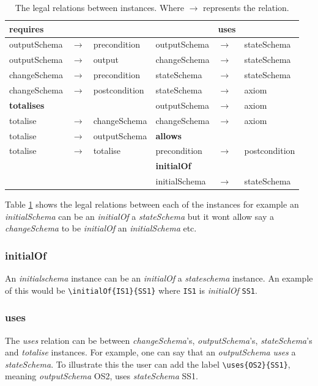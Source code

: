 \begin{table}[H]
\begin{tabular}{|lll||lll|}
\hline
\textbf{requires} & & &  & \textbf{uses} & \\
\hline
outputSchema & $\longrightarrow$ & precondition  & outputSchema & $\longrightarrow$ & stateSchema\\
outputSchema & $\longrightarrow$ & output & changeSchema & $\longrightarrow$ & stateSchema \\
changeSchema & $\longrightarrow$ & precondition  & stateSchema & $\longrightarrow$ & stateSchema \\
changeSchema & $\longrightarrow$ & postcondition  & stateSchema & $\longrightarrow$ & axiom \\
\cline{1-3}
\textbf{totalises} & &  & outputSchema & $\longrightarrow$ & axiom \\
\cline{1-3}
totalise & $\longrightarrow$ & changeSchema  & changeSchema & $\longrightarrow$ & axiom \\
\cline{4-6}
totalise & $\longrightarrow$ & outputSchema & \textbf{allows}  & & \\
\cline{4-6}
totalise & $\longrightarrow$ & totalise  & precondition  & $\longrightarrow$  & postcondition \\
\cline{4-6}
& &  & \textbf{initialOf} &  &  \\ 
\cline{4-6}
& &  & initialSchema & $\longrightarrow$ & stateSchema \\ 
\hline
\end{tabular}
\caption{\label{tab:relationsallowed} The legal relations between instances. Where $\longrightarrow$ represents the relation.}
\end{table}

Table \ref{tab:relationsallowed} shows the legal relations between each of the instances for example an \emph{initialSchema} can be an \emph{initialOf} a \emph{stateSchema} but it wont allow say a \emph{changeSchema} to be \emph{initialOf} an \emph{initialSchema} etc.

\subsubsection{initialOf}

An \emph{initialschema} instance can be an \emph{initialOf} a \emph{stateschema} instance. An example of this would be \verb|\initialOf{IS1}{SS1}| where \verb|IS1| is \emph{initialOf} \verb|SS1|.

\subsubsection{uses}
The \emph{uses} relation can be between \emph{changeSchema}'s, \emph{outputSchema}'s, \emph{stateSchema}'s and \emph{totalise} instances. For example, one can say that an \emph{outputSchema} \emph{uses} a \emph{stateSchema}. To illustrate this the user can add the label \verb|\uses{OS2}{SS1}|, meaning \emph{outputSchema} OS2, uses \emph{stateSchema} SS1.

